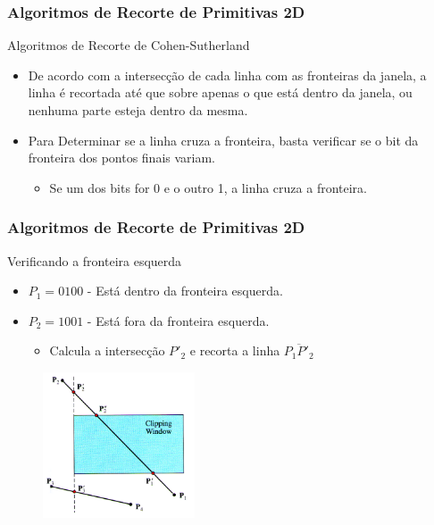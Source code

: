 \documentclass{beamer}
\begin{document}
\begin{frame}
\frametitle{Algoritmos de Recorte de Primitivas 2D}

	\begin{block}{Algoritmos de Recorte de Cohen-Sutherland}
		\begin{itemize}
			\item<1-> De acordo com a intersecção de cada linha com as fronteiras da janela, a linha é recortada até que sobre apenas o que está dentro da janela, ou nenhuma parte esteja dentro da mesma.
			\item<2-> Para Determinar se a linha cruza a fronteira, basta verificar se o bit da fronteira dos pontos finais variam.
			\begin{itemize}
				\item Se um dos bits for 0 e o outro 1, a linha cruza a fronteira.
			\end{itemize}
		\end{itemize}
	\end{block}
\end{frame}

\begin{frame}
\frametitle{Algoritmos de Recorte de Primitivas 2D}

	\begin{block}{Verificando a fronteira esquerda}
		\begin{itemize}
			\item $P_1 = 0100$ - Está dentro da fronteira esquerda.
			\item $P_2 = 1001$ - Está fora da fronteira esquerda.
			\begin{itemize}
				\item Calcula a intersecção $P'_2$ e recorta a linha $\overline{P_1P'_2}$
			\end{itemize}
		\end{itemize}
	\end{block}
	
	\begin{figure}[!h]
			\begin{center}
				\includegraphics[width=0.4\textwidth]{Figures/IntLin}
			\end{center}
	\end{figure}	
\end{frame}
\end{document}

